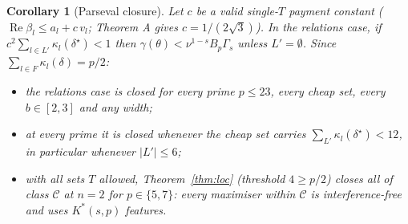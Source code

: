 \documentclass[11pt]{article}
\newtheorem{corollary}[theorem]{Corollary}
\theoremstyle{definition}
\renewcommand{\Re}{\operatorname{Re}}
\begin{document}
\begin{corollary}[Parseval closure]\label{cor:parseval}
Let $c$ be a valid single-$T$ payment constant ($\Re\beta_l\le a_l+c\,v_l$; Theorem A gives $c=1/(2\sqrt3)$).  In the relations case,
if $c^2\sum_{l\in L'}\kappa_l(\delta^\star)<1$ then $\gamma(\theta)<\nu^{1-s}B_p\Gamma_s$ unless $L'=\emptyset$.  Since $\sum_{l\in F}\kappa_l(\delta)=p/2$:
\begin{itemize}
\item[(a)] the relations case is closed for every prime $p\le23$, every cheap set, every $b\in[2,3]$ and any width;
\item[(b)] at every prime it is closed whenever the cheap set carries $\sum_{L'}\kappa_l(\delta^\star)<12$, in particular whenever $|L'|\le6$;
\item[(c)] with all sets $T$ allowed, Theorem~\ref{thm:loc} (threshold $4\ge p/2$) closes all of class $\mathcal C$ at $n=2$ for $p\in\{5,7\}$: every maximiser within
$\mathcal C$ is interference-free and uses $K^*(s,p)$ features.
\end{itemize}
\end{corollary}
\end{document}

